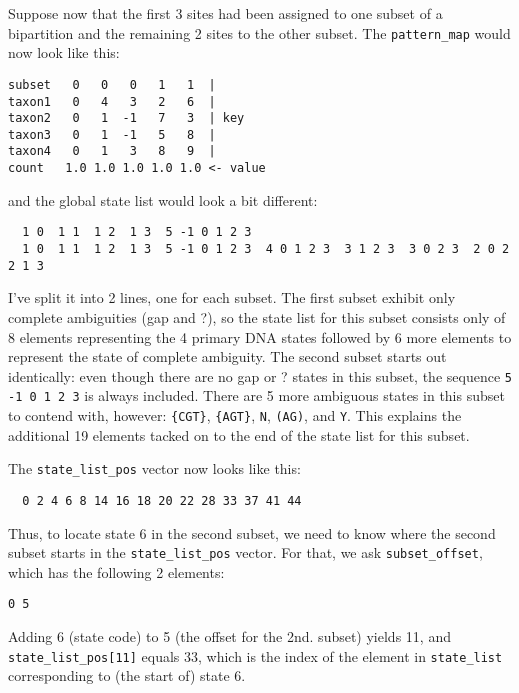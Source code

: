 Suppose now that the first 3 sites had been assigned to one subset of a bipartition and the remaining 2 sites to the other subset. The {\tt pattern\_map} would now look like this:
\begin{verbatim}
subset   0   0   0   1   1  |
taxon1   0   4   3   2   6  |
taxon2   0   1  -1   7   3  | key
taxon3   0   1  -1   5   8  |
taxon4   0   1   3   8   9  |
count   1.0 1.0 1.0 1.0 1.0 <- value
\end{verbatim}
and the global state list would look a bit different:
\begin{verbatim}
  1 0  1 1  1 2  1 3  5 -1 0 1 2 3 
  1 0  1 1  1 2  1 3  5 -1 0 1 2 3  4 0 1 2 3  3 1 2 3  3 0 2 3  2 0 2  2 1 3
\end{verbatim}
%
I've split it into 2 lines, one for each subset. The first subset exhibit only complete ambiguities (gap and ?), so the state list for this subset consists only of 8 elements representing the 4 primary DNA states followed by 6 more elements to represent the state of complete ambiguity. The second subset starts out identically: even though there are no gap or ? states in this subset, the sequence {\tt 5 -1 0 1 2 3} is always included. There are 5 more ambiguous states in this subset to contend with, however: {\tt \{CGT\}}, {\tt \{AGT\}}, {\tt N}, {\tt (AG)}, and {\tt Y}. This explains the additional 19 elements tacked on to the end of the state list for this subset.

The {\tt state\_list\_pos} vector now looks like this:
\begin{verbatim}
  0 2 4 6 8 14 16 18 20 22 28 33 37 41 44
\end{verbatim}
Thus, to locate state 6 in the second subset, we need to know where the second subset starts in the {\tt state\_list\_pos} vector. For that, we ask {\tt subset\_offset}, which has the following 2 elements:
\begin{verbatim} 
0 5
\end{verbatim}
Adding 6 (state code) to 5 (the offset for the 2nd. subset) yields 11, and {\tt state\_list\_pos[11]} equals 33, which is the index of the element in {\tt state\_list} corresponding to (the start of) state 6.

